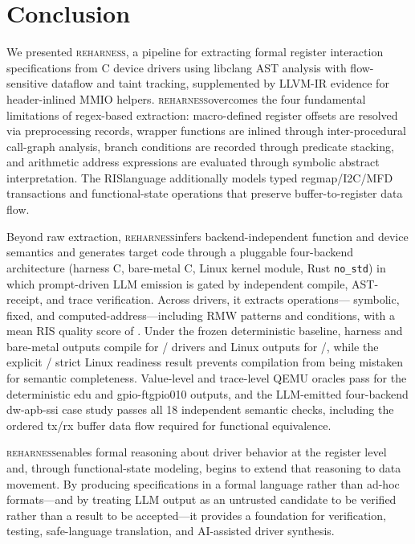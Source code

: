 \documentclass[sigplan, screen, review, anonymous]{acmart}
\newcommand{\reharness}{\textsc{reharness}}
\newcommand{\rislang}{RIS}
\begin{document}
\section{Conclusion}

We presented \reharness, a pipeline for extracting formal register interaction specifications from C device drivers using libclang AST analysis with flow-sensitive dataflow and taint tracking, supplemented by LLVM-IR evidence for header-inlined MMIO helpers. \reharness overcomes the four fundamental limitations of regex-based extraction: macro-defined register offsets are resolved via preprocessing records, wrapper functions are inlined through inter-procedural call-graph analysis, branch conditions are recorded through predicate stacking, and arithmetic address expressions are evaluated through symbolic abstract interpretation. The \rislang language additionally models typed regmap/I2C/MFD transactions and functional-state operations that preserve buffer-to-register data flow.

Beyond raw extraction, \reharness infers backend-independent function and device semantics and generates target code through a pluggable four-backend architecture (harness C, bare-metal C, Linux kernel module, Rust \texttt{no\_std}) in which prompt-driven LLM emission is gated by independent compile, AST-receipt, and trace verification. Across \EvalDrivers{} drivers, it extracts \EvalOps{} operations---\EvalSymbolic{} symbolic, \EvalFixed{} fixed, and \EvalComputed{} computed-address---including \EvalRMW{} RMW patterns and \EvalConditions{} conditions, with a mean RIS quality score of \EvalMeanRIS{}. Under the frozen deterministic baseline, harness and bare-metal outputs compile for \HarnessCompileCount{}/\EvalDrivers{} drivers and Linux outputs for \LinuxCompileCount{}/\EvalDrivers{}, while the explicit \LinuxReadyCount{}/\EvalDrivers{} strict Linux readiness result prevents compilation from being mistaken for semantic completeness. Value-level and trace-level QEMU oracles pass for the deterministic edu and gpio-ftgpio010 outputs, and the LLM-emitted four-backend dw-apb-ssi case study passes all 18 independent semantic checks, including the ordered tx/rx buffer data flow required for functional equivalence.

\reharness enables formal reasoning about driver behavior at the register level and, through functional-state modeling, begins to extend that reasoning to data movement. By producing specifications in a formal language rather than ad-hoc formats---and by treating LLM output as an untrusted candidate to be verified rather than a result to be accepted---it provides a foundation for verification, testing, safe-language translation, and AI-assisted driver synthesis.
\end{document}
